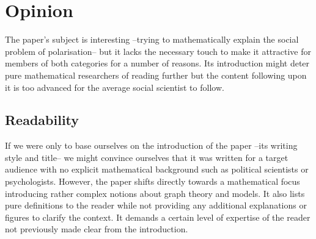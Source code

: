 \documentclass[14]{article}
\begin{document}





\section{Opinion}
The paper's subject is interesting --trying to mathematically explain the social problem of polarisation-- but it lacks the necessary touch to make it attractive for members of both categories for a number of reasons. Its introduction might deter pure mathematical researchers of reading further but the content following upon it is too advanced for the average social scientist to follow.

\subsection{Readability}
If we were only to base ourselves on the introduction of the paper --its writing style and title-- we might convince ourselves that it was written for a target audience with no explicit mathematical background such as political scientists or psychologists. However, the paper shifts directly towards a mathematical focus introducing rather complex notions about graph theory and models. It also lists pure definitions to the reader while not providing any additional explanations or figures to clarify the context. It demands a certain level of expertise of the reader not previously made clear from the introduction. 
\end{document}
